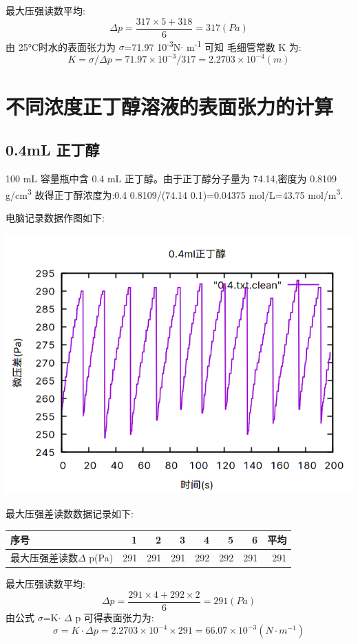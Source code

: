 \documentclass[11pt]{report}
\begin{document}
最大压强读数平均:
\[
    \Delta p =\frac{317\times 5 + 318}{6}=317(Pa)
    \]
由 25°C时水的表面张力为 \(\sigma\)=71.97\texttimes{} 10\textsuperscript{-3}N\(\cdot\) m\textsuperscript{-1} 可知
毛细管常数 K 为:
\[
    K=\sigma /\Delta p =71.97\times 10^{-3}/317=2.2703\times 10^{-4}(m)
    \]
\chapter{不同浓度正丁醇溶液的表面张力的计算}
\label{sec:org7c960de}

\section{0.4mL 正丁醇}
\label{sec:org2809f80}
    100 mL 容量瓶中含 0.4 mL 正丁醇。由于正丁醇分子量为 74.14,密度为 0.8109 g/cm\textsuperscript{3}
故得正丁醇浓度为:0.4\texttimes{} 0.8109/(74.14\texttimes{} 0.1)=0.04375 mol/L=43.75 mol/m\textsuperscript{3}.

电脑记录数据作图如下:
\begin{center}
\includegraphics[width=.9\linewidth]{../img/0.4.png}
\end{center}

最大压强差读数数据记录如下:
\begin{center}
\begin{tabular}{lrrrrrrr}
序号 & 1 & 2 & 3 & 4 & 5 & 6 & 平均\\
\hline
最大压强差读数\(\Delta\) p(Pa) & 291 & 291 & 291 & 292 & 292 & 291 & 291\\
\end{tabular}
\end{center}


最大压强读数平均:
\[
    \Delta p =\frac{291\times 4 + 292 \times 2}{6}=291(Pa)
    \]
由公式 \(\sigma\)=K\(\cdot\) \(\Delta\) p 可得表面张力为:
\[
    \sigma=K\cdot \Delta p=2.2703\times 10^{-4}\times 291=66.07\times 10^{-3}(N\cdot m^{-1})
    \]
\end{document}
